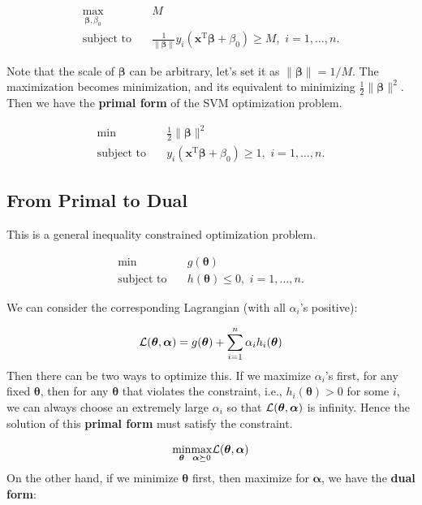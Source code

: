 \documentclass[
]{book}
\theoremstyle{definition}
\theoremstyle{definition}
\theoremstyle{definition}
\theoremstyle{definition}
\theoremstyle{remark}
\begin{document}
\begin{align}
\underset{\boldsymbol \beta, \beta_0}{\text{max}} \quad & M \\
\text{subject to} \quad & \frac{1}{\lVert \boldsymbol \beta\lVert} y_i(\mathbf{x}^\text{T}\boldsymbol \beta+ \beta_0) \geq M, \,\, i = 1, \ldots, n.
\end{align}

Note that the scale of \(\boldsymbol \beta\) can be arbitrary, let's set it as \(\lVert \boldsymbol \beta\rVert = 1/M\). The maximization becomes minimization, and its equivalent to minimizing \(\frac{1}{2} \lVert \boldsymbol \beta\rVert^2\). Then we have the \textbf{primal form} of the SVM optimization problem.

\begin{align}
\text{min} \quad & \frac{1}{2} \lVert \boldsymbol \beta\rVert^2 \\
\text{subject to} \quad & y_i(\mathbf{x}^\text{T}\boldsymbol \beta+ \beta_0) \geq 1, \,\, i = 1, \ldots, n.
\end{align}

\hypertarget{from-primal-to-dual}{%
\subsection{From Primal to Dual}\label{from-primal-to-dual}}

This is a general inequality constrained optimization problem.

\begin{align}
\text{min} \quad & g(\boldsymbol \theta) \\
\text{subject to} \quad & h(\boldsymbol \theta) \leq 0, \,\, i = 1, \ldots, n.
\end{align}

We can consider the corresponding Lagrangian (with all \(\alpha_i\)'s positive):

\[{\cal L}(\boldsymbol \theta, \boldsymbol \alpha) = g(\boldsymbol \theta) + \sum_{i = 1}^n \alpha_i h_i(\boldsymbol \theta)\]
Then there can be two ways to optimize this. If we maximize \(\alpha_i\)'s first, for any fixed \(\boldsymbol \theta\), then for any \(\boldsymbol \theta\) that violates the constraint, i.e., \(h_i(\boldsymbol \theta) > 0\) for some \(i\), we can always choose an extremely large \(\alpha_i\) so that \(\cal{L}(\boldsymbol \theta, \boldsymbol \alpha)\) is infinity. Hence the solution of this \textbf{primal form} must satisfy the constraint.

\[\underset{\boldsymbol \theta}{\min} \underset{\boldsymbol \alpha\succeq 0}{\max} {\cal L}(\boldsymbol \theta, \boldsymbol \alpha)\]
On the other hand, if we minimize \(\boldsymbol \theta\) first, then maximize for \(\boldsymbol \alpha\), we have the \textbf{dual form}:
\end{document}
